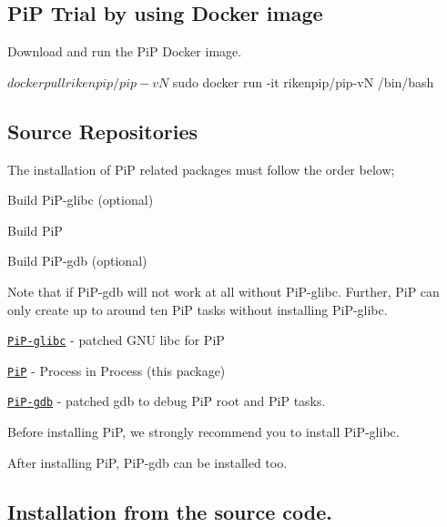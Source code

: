 \documentclass[twoside]{book}
\begin{document}
\subsection*{Pi\-P Trial by using Docker image}

Download and run the Pi\-P Docker image. \begin{DoxyVerb}$ docker pull rikenpip/pip-vN
$ sudo docker run -it rikenpip/pip-vN /bin/bash
\end{DoxyVerb}


\subsection*{Source Repositories}

The installation of Pi\-P related packages must follow the order below;


\begin{DoxyEnumerate}
\item Build Pi\-P-\/glibc (optional)
\item Build Pi\-P
\item Build Pi\-P-\/gdb (optional)
\end{DoxyEnumerate}

Note that if Pi\-P-\/gdb will not work at all without Pi\-P-\/glibc. Further, Pi\-P can only create up to around ten Pi\-P tasks without installing Pi\-P-\/glibc.


\begin{DoxyItemize}
\item \href{https://github.com/RIKEN-SysSoft/PiP-glibc}{\tt Pi\-P-\/glibc} -\/ patched G\-N\-U libc for Pi\-P
\item \href{https://github.com/RIKEN-SysSoft/PiP}{\tt Pi\-P} -\/ Process in Process (this package)
\item \href{https://github.com/RIKEN-SysSoft/PiP-gdb}{\tt Pi\-P-\/gdb} -\/ patched gdb to debug Pi\-P root and Pi\-P tasks.
\end{DoxyItemize}

Before installing Pi\-P, we strongly recommend you to install Pi\-P-\/glibc.

After installing Pi\-P, Pi\-P-\/gdb can be installed too.

\subsection*{Installation from the source code.}
\end{document}
